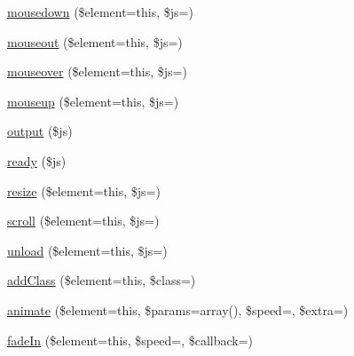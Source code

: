 \begin{DoxyCompactItemize}
\item 
\mbox{\hyperlink{class_c_i___javascript_afa625106ad51c2f80ccfadf94981041d}{mousedown}} (\$element=\textquotesingle{}this\textquotesingle{}, \$js=\textquotesingle{}\textquotesingle{})
\item 
\mbox{\hyperlink{class_c_i___javascript_ab2d069b9fbd0500e0f514e9ec5dc94e1}{mouseout}} (\$element=\textquotesingle{}this\textquotesingle{}, \$js=\textquotesingle{}\textquotesingle{})
\item 
\mbox{\hyperlink{class_c_i___javascript_af54e0f954a0bb3983011578c848faf48}{mouseover}} (\$element=\textquotesingle{}this\textquotesingle{}, \$js=\textquotesingle{}\textquotesingle{})
\item 
\mbox{\hyperlink{class_c_i___javascript_a31b2b5c28657895274f5658517a2342a}{mouseup}} (\$element=\textquotesingle{}this\textquotesingle{}, \$js=\textquotesingle{}\textquotesingle{})
\item 
\mbox{\hyperlink{class_c_i___javascript_a95bc25e9063b14d257e97e4b205073ba}{output}} (\$js)
\item 
\mbox{\hyperlink{class_c_i___javascript_a00997e6137ed7dc0de0159ed143a107b}{ready}} (\$js)
\item 
\mbox{\hyperlink{class_c_i___javascript_a972b62f88e96fb29b179469e0d49329a}{resize}} (\$element=\textquotesingle{}this\textquotesingle{}, \$js=\textquotesingle{}\textquotesingle{})
\item 
\mbox{\hyperlink{class_c_i___javascript_acb749f777082c90c2b46eb1c367522dc}{scroll}} (\$element=\textquotesingle{}this\textquotesingle{}, \$js=\textquotesingle{}\textquotesingle{})
\item 
\mbox{\hyperlink{class_c_i___javascript_abe5e3762033021416ab5c4d0dce993bf}{unload}} (\$element=\textquotesingle{}this\textquotesingle{}, \$js=\textquotesingle{}\textquotesingle{})
\item 
\mbox{\hyperlink{class_c_i___javascript_ab624b7e1064cc514288eedc7ed5f121f}{add\+Class}} (\$element=\textquotesingle{}this\textquotesingle{}, \$class=\textquotesingle{}\textquotesingle{})
\item 
\mbox{\hyperlink{class_c_i___javascript_a04c5fa4911b166171608bc2651b1b2df}{animate}} (\$element=\textquotesingle{}this\textquotesingle{}, \$params=array(), \$speed=\textquotesingle{}\textquotesingle{}, \$extra=\textquotesingle{}\textquotesingle{})
\item 
\mbox{\hyperlink{class_c_i___javascript_ac4255e434413b0b439e6ecd2d19f54d1}{fade\+In}} (\$element=\textquotesingle{}this\textquotesingle{}, \$speed=\textquotesingle{}\textquotesingle{}, \$callback=\textquotesingle{}\textquotesingle{})

\end{DoxyCompactItemize}
